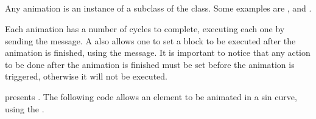 \documentclass[a4paper,10pt,twoside]{book}
\begin{document}
%
%	


%
%

\subsection*{}
Any animation is an instance of a subclass of the  class. Some examples are ,  and .

Each animation has a number of cycles to complete, executing each one by sending the  message.
A  also allows one to set a block to be executed after the animation is finished, using the  message. It is important to notice that any action to be done after the animation is finished must be set before the animation is triggered, otherwise it will not be executed.  

 presents . The following code allows an element to be animated in a sin curve, using the .
\end{document}
